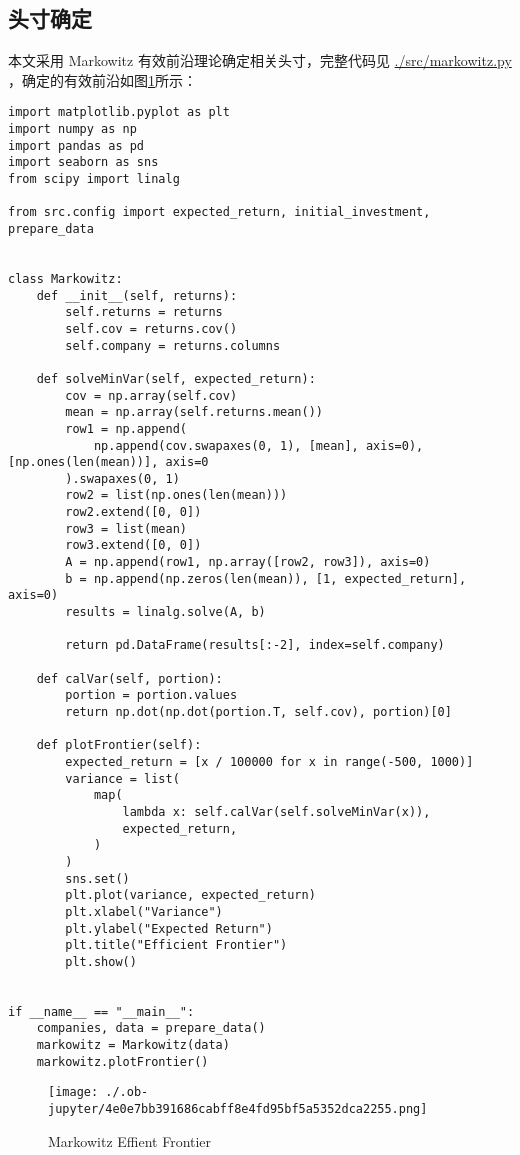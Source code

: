 \documentclass[a4paper,12pt]{ctexart}
\begin{document}
\subsection{头寸确定}
\label{sec:orga4508df}
本文采用 Markowitz 有效前沿理论确定相关头寸，完整代码见 \url{./src/markowitz.py} ，确定的有效前沿如图\ref{fig:org5fe265c}所示：
\begin{verbatim}
import matplotlib.pyplot as plt
import numpy as np
import pandas as pd
import seaborn as sns
from scipy import linalg

from src.config import expected_return, initial_investment, prepare_data


class Markowitz:
    def __init__(self, returns):
        self.returns = returns
        self.cov = returns.cov()
        self.company = returns.columns

    def solveMinVar(self, expected_return):
        cov = np.array(self.cov)
        mean = np.array(self.returns.mean())
        row1 = np.append(
            np.append(cov.swapaxes(0, 1), [mean], axis=0), [np.ones(len(mean))], axis=0
        ).swapaxes(0, 1)
        row2 = list(np.ones(len(mean)))
        row2.extend([0, 0])
        row3 = list(mean)
        row3.extend([0, 0])
        A = np.append(row1, np.array([row2, row3]), axis=0)
        b = np.append(np.zeros(len(mean)), [1, expected_return], axis=0)
        results = linalg.solve(A, b)

        return pd.DataFrame(results[:-2], index=self.company)

    def calVar(self, portion):
        portion = portion.values
        return np.dot(np.dot(portion.T, self.cov), portion)[0]

    def plotFrontier(self):
        expected_return = [x / 100000 for x in range(-500, 1000)]
        variance = list(
            map(
                lambda x: self.calVar(self.solveMinVar(x)),
                expected_return,
            )
        )
        sns.set()
        plt.plot(variance, expected_return)
        plt.xlabel("Variance")
        plt.ylabel("Expected Return")
        plt.title("Efficient Frontier")
        plt.show()


if __name__ == "__main__":
    companies, data = prepare_data()
    markowitz = Markowitz(data)
    markowitz.plotFrontier()

\end{verbatim}
\begin{figure}[htbp]
\centering
\texttt{[image: ./.ob-jupyter/4e0e7bb391686cabff8e4fd95bf5a5352dca2255.png]}
\caption{\label{fig:org5fe265c}Markowitz Effient Frontier}
\end{figure}
\end{document}
